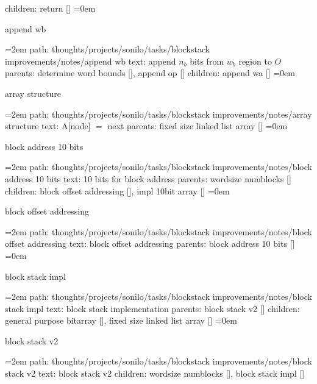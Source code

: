 children: return []
\smallskip
\leftskip=0em
\par\endgroup
\bigskip
{}
append wb
\smallskip
\par\begingroup
\leftskip=2em
path: thoughts/projects/sonilo/tasks/blockstack improvements/notes/append wb
\smallskip
text:  append $n_b$ bits from $w_b$ region to $O$
\smallskip
parents:  determine word bounds [], append op []
\smallskip
children: append wa []
\smallskip
\leftskip=0em
\par\endgroup
\bigskip
{}
array structure
\smallskip
\par\begingroup
\leftskip=2em
path: thoughts/projects/sonilo/tasks/blockstack improvements/notes/array structure
\smallskip
text:  A[node] $=$ next
\smallskip
parents:  fixed size linked list array []
\smallskip
\leftskip=0em
\par\endgroup
\bigskip
{}
block address 10 bits
\smallskip
\par\begingroup
\leftskip=2em
path: thoughts/projects/sonilo/tasks/blockstack improvements/notes/block address 10 bits
\smallskip
text:  10 bits for block address
\smallskip
parents:  wordsize numblocks []
\smallskip
children: block offset addressing [], impl 10bit array []
\smallskip
\leftskip=0em
\par\endgroup
\bigskip
{}
block offset addressing
\smallskip
\par\begingroup
\leftskip=2em
path: thoughts/projects/sonilo/tasks/blockstack improvements/notes/block offset addressing
\smallskip
text:  block offset addressing
\smallskip
parents:  block address 10 bits []
\smallskip
\leftskip=0em
\par\endgroup
\bigskip
{}
block stack impl
\smallskip
\par\begingroup
\leftskip=2em
path: thoughts/projects/sonilo/tasks/blockstack improvements/notes/block stack impl
\smallskip
text:  block stack implementation
\smallskip
parents:  block stack v2 []
\smallskip
children: general purpose bitarray [], fixed size linked list array []
\smallskip
\leftskip=0em
\par\endgroup
\bigskip
{}
block stack v2
\smallskip
\par\begingroup
\leftskip=2em
path: thoughts/projects/sonilo/tasks/blockstack improvements/notes/block stack v2
\smallskip
text:  block stack v2
\smallskip
children: wordsize numblocks [], block stack impl []
